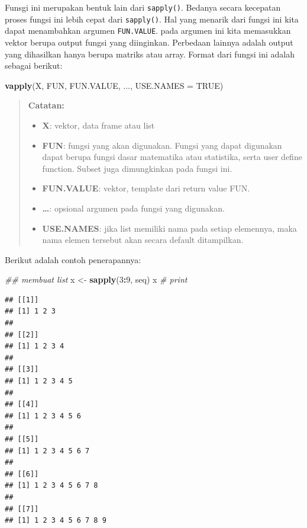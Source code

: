 \documentclass[]{book}
\newenvironment{Shaded}{\begin{snugshade}}{\end{snugshade}}
\newcommand{\CommentTok}[1]{\textcolor[rgb]{0.56,0.35,0.01}{\textit{#1}}}
\newcommand{\DataTypeTok}[1]{\textcolor[rgb]{0.13,0.29,0.53}{#1}}
\newcommand{\DecValTok}[1]{\textcolor[rgb]{0.00,0.00,0.81}{#1}}
\newcommand{\KeywordTok}[1]{\textcolor[rgb]{0.13,0.29,0.53}{\textbf{#1}}}
\newcommand{\NormalTok}[1]{#1}
\newcommand{\OperatorTok}[1]{\textcolor[rgb]{0.81,0.36,0.00}{\textbf{#1}}}
\newcommand{\OtherTok}[1]{\textcolor[rgb]{0.56,0.35,0.01}{#1}}
\newcommand{\StringTok}[1]{\textcolor[rgb]{0.31,0.60,0.02}{#1}}
\providecommand{\tightlist}{%
  \setlength{\itemsep}{0pt}\setlength{\parskip}{0pt}}
\theoremstyle{definition}
\theoremstyle{definition}
\theoremstyle{definition}
\theoremstyle{remark}
\begin{document}
Funsgi ini merupakan bentuk lain dari \texttt{sapply()}. Bedanya secara kecepatan proses fungsi ini lebih cepat dari \texttt{sapply()}. Hal yang menarik dari fungsi ini kita dapat menambahkan argumen \texttt{FUN.VALUE}. pada argumen ini kita memasukkan vektor berupa output fungsi yang diinginkan. Perbedaan lainnya adalah output yang dihasilkan hanya berupa matriks atau array. Format dari fungsi ini adalah sebagai berikut:

\begin{Shaded}
\begin{Highlighting}[]
\KeywordTok{vapply}\NormalTok{(X, FUN, FUN.VALUE, ..., }\DataTypeTok{USE.NAMES =} \OtherTok{TRUE}\NormalTok{)}
\end{Highlighting}
\end{Shaded}

\begin{quote}
\textbf{Catatan:}

\begin{itemize}
\tightlist
\item
  \textbf{X}: vektor, data frame atau list
\item
  \textbf{FUN}: fungsi yang akan digunakan. Fungsi yang dapat digunakan dapat berupa fungsi dasar matematika atau statistika, serta user define function. Subset juga dimungkinkan pada fungsi ini.
\item
  \textbf{FUN.VALUE}: vektor, template dari return value FUN.
\item
  \textbf{\ldots{}}: opsional argumen pada fungsi yang digunakan.
\item
  \textbf{USE.NAMES}: jika list memiliki nama pada setiap elemennya, maka nama elemen tersebut akan secara default ditampilkan.
\end{itemize}
\end{quote}

Berikut adalah contoh penerapannya:

\begin{Shaded}
\begin{Highlighting}[]
\CommentTok{## membuat list}
\NormalTok{x <-}\StringTok{ }\KeywordTok{sapply}\NormalTok{(}\DecValTok{3}\OperatorTok{:}\DecValTok{9}\NormalTok{, seq)}
\NormalTok{x }\CommentTok{# print}
\end{Highlighting}
\end{Shaded}

\begin{verbatim}
## [[1]]
## [1] 1 2 3
## 
## [[2]]
## [1] 1 2 3 4
## 
## [[3]]
## [1] 1 2 3 4 5
## 
## [[4]]
## [1] 1 2 3 4 5 6
## 
## [[5]]
## [1] 1 2 3 4 5 6 7
## 
## [[6]]
## [1] 1 2 3 4 5 6 7 8
## 
## [[7]]
## [1] 1 2 3 4 5 6 7 8 9
\end{verbatim}
\end{document}

